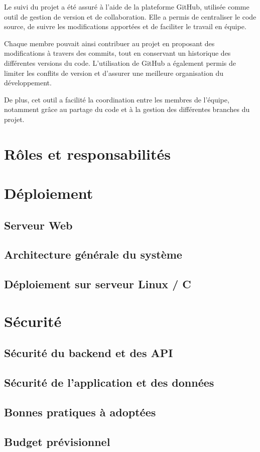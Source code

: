 Le suivi du projet a été assuré à l’aide de la plateforme GitHub, utilisée comme outil de gestion de version et de collaboration. Elle a permis de centraliser le code source, de suivre les modifications apportées et de faciliter le travail en équipe.

\noindent Chaque membre pouvait ainsi contribuer au projet en proposant des modifications à travers des commits, tout en conservant un historique des différentes versions du code. L’utilisation de GitHub a également permis de limiter les conflits de version et d’assurer une meilleure organisation du développement.

\noindent De plus, cet outil a facilité la coordination entre les membres de l’équipe, notamment grâce au partage du code et à la gestion des différentes branches du projet.

\section{Rôles et responsabilités}
\section{Déploiement}
\subsection{Serveur Web}
\subsection{Architecture générale du système}
\subsection{Déploiement sur serveur Linux / C}


\section{Sécurité}
\subsection{Sécurité du backend et des API}
\subsection{Sécurité de l'application et des données}
\subsection{Bonnes pratiques à adoptées}
\subsection{Budget prévisionnel}